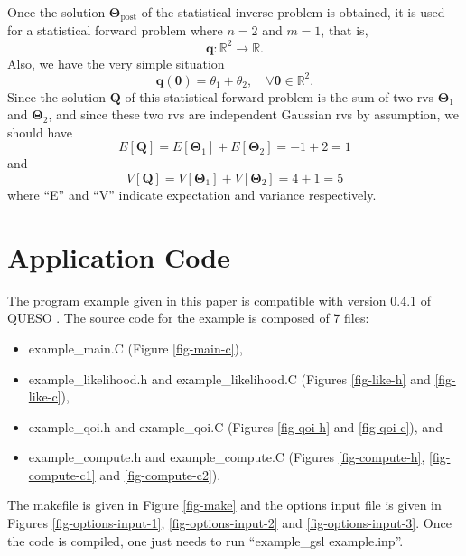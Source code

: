 Once the solution $\boldsymbol{\Theta}_{\text{post}}$ of the statistical inverse problem is obtained,
it is used for a statistical forward problem where $n=2$ and $m=1$, that is,
\begin{equation*}
\mathbf{q}:\mathbb{R}^2\rightarrow\mathbb{R}.
\end{equation*}
Also, we have the very simple situation
\begin{equation}\label{eq-example-q}
\mathbf{q}(\boldsymbol{\theta}) = \theta_1+\theta_2,\quad\forall\boldsymbol{\theta}\in\mathbb{R}^2.
\end{equation}
Since the solution $\mathbf{Q}$ of this statistical forward problem is the sum of
two rvs $\boldsymbol{\Theta}_1$ and $\boldsymbol{\Theta}_2$,
and since these two rvs are independent Gaussian rvs by assumption, we should have
\begin{equation}\label{eq-example-E}
E[\mathbf{Q}] = E[\boldsymbol{\Theta}_1] + E[\boldsymbol{\Theta}_2] = -1 + 2 = 1
\end{equation}
and
\begin{equation}\label{eq-example-V}
V[\mathbf{Q}] = V[\boldsymbol{\Theta}_1] + V[\boldsymbol{\Theta}_2] = 4 + 1 = 5
\end{equation}
where ``E'' and ``V'' indicate expectation and variance respectively.

\clearpage
\section{Application Code}

The program example given in this paper is compatible with version 0.4.1 of QUESO \cite{Pr09c}.
The source code for the example is composed of 7 files:
\begin{itemize}
\item example\_main.C (Figure \ref{fig-main-c}),
\item example\_likelihood.h and example\_likelihood.C (Figures \ref{fig-like-h} and \ref{fig-like-c}),
\item example\_qoi.h and example\_qoi.C (Figures \ref{fig-qoi-h} and \ref{fig-qoi-c}), and
\item example\_compute.h and example\_compute.C (Figures \ref{fig-compute-h}, \ref{fig-compute-c1} and \ref{fig-compute-c2}).
\end{itemize}
The makefile is given in Figure \ref{fig-make} and the options input file is given in Figures \ref{fig-options-input-1}, \ref{fig-options-input-2} and \ref{fig-options-input-3}.
Once the code is compiled, one just needs to run ``example\_gsl example.inp''.

